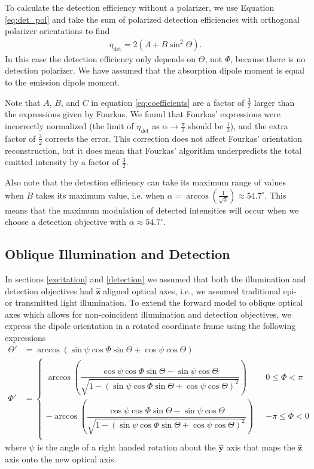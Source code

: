 \documentclass[10pt]{article}
\providecommand{\mh}[1]{\mathbf{\hat{#1}}}
\begin{document}
To calculate the detection efficiency without a polarizer, we use Equation
\ref{eq:det_pol} and take the sum of polarized detection efficiencies with
orthogonal polarizer orientations to find
\begin{align}
  \eta_{\text{det}} = 2(A + B\sin^2\Theta). \label{eq:scalardet}
\end{align}
In this case the detection efficiency only depends on $\Theta$, not $\Phi$,
because there is no detection polarizer. We have assumed that the absorption
dipole moment is equal to the emission dipole moment.

Note that $A$, $B$, and $C$ in equation \ref{eq:coefficients} are a factor of
$\frac{3}{2}$ larger than the expressions given by Fourkas. We found that
Fourkas' expressions were incorrectly normalized (the limit of
$\eta_{\text{det}}$ as $\alpha\rightarrow \frac{\pi}{2}$ should be $\frac{1}{2}$), and
the extra factor of $\frac{3}{2}$ corrects the error. This correction does not
affect Fourkas' orientation reconstruction, but it does mean that Fourkas'
algorithm underpredicts the total emitted intensity by a factor of
$\frac{3}{2}$.

Also note that the detection efficiency can take its maximum range of values
when $B$ takes its maximum value, i.e. when
$\alpha=\arccos\left(\frac{1}{\sqrt{3}}\right) \approx 54.7^{\circ}$. This means
that the maximum modulation of detected intensities will occur when we choose a
detection objective with $\alpha \approx 54.7^{\circ}$.

\subsection{Oblique Illumination and Detection}\label{oblique}
In sections \ref{excitation} and \ref{detection} we assumed that both the
illumination and detection objectives had $\mh{z}$ aligned optical axes, i.e.,
we assumed traditional epi- or transmitted light illumination. To extend the
forward model to oblique optical axes which allows for non-coincident
illumination and detection objectives, we express the dipole orientation in a
rotated coordinate frame using the following expressions
\begin{align}
    \Theta' &= \arccos\left(\sin\psi\cos\Phi\sin\Theta + \cos\psi\cos\Theta\right)\label{eq:thetap}\\
  \Phi' &=
          \begin{cases}
            \arccos\left(\dfrac{\cos\psi\cos\Phi\sin\Theta - \sin\psi\cos\Theta}{\sqrt{1 - (\sin\psi\cos\Phi\sin\Theta + \cos\psi\cos\Theta)^2}}\right) \ \ \ &0 \leq \Phi < \pi  \\
            -\arccos\left(\dfrac{\cos\psi\cos\Phi\sin\Theta - \sin\psi\cos\Theta}{\sqrt{1 - (\sin\psi\cos\Phi\sin\Theta + \cos\psi\cos\Theta)^2}}\right) \ \ \ &-\pi \leq \Phi < 0\\
          \end{cases}\label{eq:phip}
\end{align}
where $\psi$ is the angle of a right handed rotation about the $\mh{y}$ axis
that maps the $\mh{z}$ axis onto the new optical axis.
\end{document}
